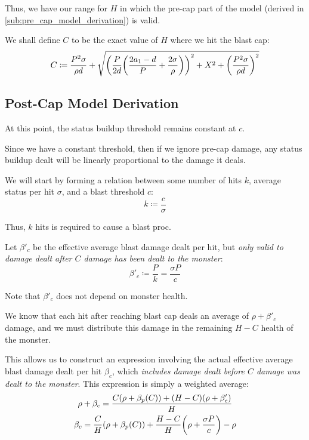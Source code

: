 \documentclass{article}
\begin{document}
Thus, we have our range for $H$ in which the pre-cap part of the model (derived in \autoref{sub:pre_cap_model_derivation}) is valid.

We shall define $C$ to be the exact value of $H$ where we hit the blast cap:
\begin{equation}
    C
    \coloneqq
    \frac{P^2 \sigma}{\rho d}
    + \sqrt{
        \parens*{\frac{P}{2d} \parens*{\frac{2 a_1 - d}{P} + \frac{2 \sigma}{\rho}}}^2
        + X^2
        + \parens*{\frac{P^2 \sigma}{\rho d}}^2
    }
    \label{eq:health_blast_cap}
\end{equation}


\subsection{Post-Cap Model Derivation}%
\label{sub:post_cap_model_derivation}

At this point, the status buildup threshold remains constant at $c$.

Since we have a constant threshold, then if we ignore pre-cap damage, any status buildup dealt will be linearly proportional to the damage it deals.

We will start by forming a relation between some number of hits $k$, average status per hit $\sigma$, and a blast threshold $c$:
\begin{equation}
    k \coloneqq \frac{c}{\sigma}
\end{equation}

Thus, $k$ hits is required to cause a blast proc.

Let $\beta'_c$ be the effective average blast damage dealt per hit, but \textit{only valid to damage dealt after $C$ damage has been dealt to the monster}:
\begin{equation}
    \beta'_c \coloneqq \frac{P}{k} = \frac{\sigma P}{c}
\end{equation}

Note that $\beta'_c$ does not depend on monster health.

We know that each hit after reaching blast cap deals an average of $\rho + \beta'_c$ damage, and we must distribute this damage in the remaining $H - C$ health of the monster.

This allows us to construct an expression involving the actual effective average blast damage dealt per hit $\beta_c$, which \textit{includes damage dealt before $C$ damage was dealt to the monster}. This expression is simply a weighted average:
\begin{gather}
    \rho + \beta_c = \frac{C \parens*{\rho + \beta_p(C)} + \parens*{H - C} \parens*{\rho + \beta'_c}}{H} 
    \\
    \beta_c = \frac{C}{H} \parens*{\rho + \beta_p(C)} + \frac{H - C}{H} \parens*{\rho + \frac{\sigma P}{c}} - \rho
\end{gather}
\end{document}
